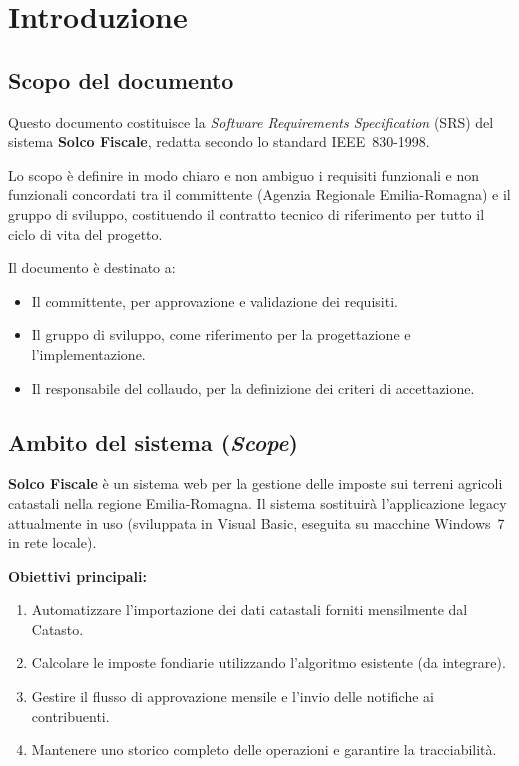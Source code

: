 \documentclass[12pt, a4paper]{article}
\begin{document}
\section{Introduzione}

\subsection{Scopo del documento}

Questo documento costituisce la \textit{Software Requirements Specification} (SRS) del sistema
\textbf{Solco Fiscale}, redatta secondo lo standard IEEE~830-1998.

Lo scopo è definire in modo chiaro e non ambiguo i requisiti funzionali e non funzionali
concordati tra il committente (Agenzia Regionale Emilia-Romagna) e il gruppo di sviluppo,
costituendo il contratto tecnico di riferimento per tutto il ciclo di vita del progetto.

Il documento è destinato a:
\begin{itemize}
  \item Il committente, per approvazione e validazione dei requisiti.
  \item Il gruppo di sviluppo, come riferimento per la progettazione e l'implementazione.
  \item Il responsabile del collaudo, per la definizione dei criteri di accettazione.
\end{itemize}

\subsection{Ambito del sistema (\textit{Scope})}

\textbf{Solco Fiscale} è un sistema web per la gestione delle imposte sui terreni agricoli
catastali nella regione Emilia-Romagna. Il sistema sostituirà l'applicazione legacy
attualmente in uso (sviluppata in Visual Basic, eseguita su macchine Windows~7 in rete locale).

\medskip\noindent\textbf{Obiettivi principali:}
\begin{enumerate}
  \item Automatizzare l'importazione dei dati catastali forniti mensilmente dal Catasto.
  \item Calcolare le imposte fondiarie utilizzando l'algoritmo esistente (da integrare).
  \item Gestire il flusso di approvazione mensile e l'invio delle notifiche ai contribuenti.
  \item Mantenere uno storico completo delle operazioni e garantire la tracciabilità.
\end{enumerate}
\end{document}
